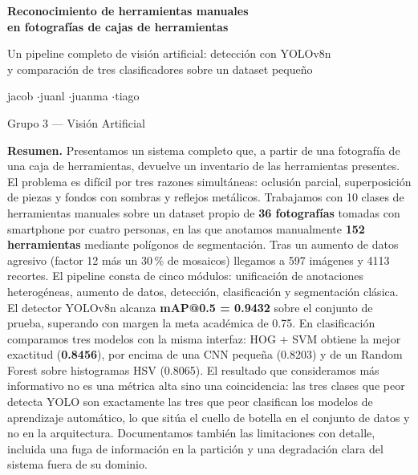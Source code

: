 \documentclass[11pt,a4paper]{article}
\begin{document}
\begin{titlepage}
\centering
\vspace*{2cm}

{\LARGE\bfseries Reconocimiento de herramientas manuales\\[0.3em]
en fotografías de cajas de herramientas\par}

\vspace{0.8em}
{\large Un pipeline completo de visión artificial: detección con YOLOv8n\\
y comparación de tres clasificadores sobre un dataset pequeño\par}

\vspace{1.5cm}

{\large jacob \quad$\cdot$\quad juanl \quad$\cdot$\quad juanma \quad$\cdot$\quad tiago\par}

\vspace{0.5em}
{\normalsize Grupo 3 --- Visión Artificial\par}

\vspace{2cm}

\begin{minipage}{0.85\textwidth}
\small
\textbf{Resumen.} Presentamos un sistema completo que, a partir de una fotografía de una
caja de herramientas, devuelve un inventario de las herramientas presentes. El problema es
difícil por tres razones simultáneas: oclusión parcial, superposición de piezas y fondos con
sombras y reflejos metálicos. Trabajamos con 10 clases de herramientas manuales sobre un
dataset propio de \textbf{36 fotografías} tomadas con smartphone por cuatro personas, en las
que anotamos manualmente \textbf{152 herramientas} mediante polígonos de segmentación. Tras
un aumento de datos agresivo (factor 12 más un 30\,\% de mosaicos) llegamos a 597 imágenes y
4113 recortes. El pipeline consta de cinco módulos: unificación de anotaciones heterogéneas,
aumento de datos, detección, clasificación y segmentación clásica. El detector YOLOv8n
alcanza \textbf{mAP@0.5 = 0.9432} sobre el conjunto de prueba, superando con margen la meta
académica de 0.75. En clasificación comparamos tres modelos con la misma interfaz: HOG + SVM
obtiene la mejor exactitud (\textbf{0.8456}), por encima de una CNN pequeña (0.8203) y de un
Random Forest sobre histogramas HSV (0.8065). El resultado que consideramos más informativo
no es una métrica alta sino una coincidencia: las tres clases que peor detecta YOLO son
exactamente las tres que peor clasifican los modelos de aprendizaje automático, lo que sitúa
el cuello de botella en el conjunto de datos y no en la arquitectura. Documentamos también
las limitaciones con detalle, incluida una fuga de información en la partición y una
degradación clara del sistema fuera de su dominio.
\end{minipage}


\end{titlepage}
\end{document}
